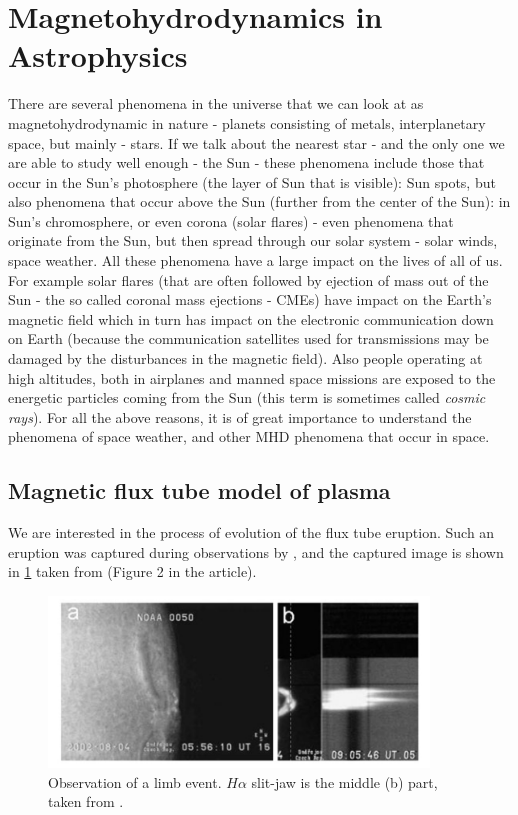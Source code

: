 \section{Magnetohydrodynamics in Astrophysics}
There are several phenomena in the universe that we can look at as magnetohydrodynamic in nature - planets consisting of metals, interplanetary space, but mainly - stars. If we talk about the nearest star - and the only one we are able to study well enough - the Sun - these phenomena include those that occur in the Sun's photosphere (the layer of Sun that is visible): Sun spots, but also phenomena that occur above the Sun (further from the center of the Sun): in Sun's chromosphere, or even corona (solar flares) - even phenomena that originate from the Sun, but then spread through our solar system - solar winds, space weather. All these phenomena have a large impact on the lives of all of us. For example solar flares (that are often followed by ejection of mass out of the Sun - the so called coronal mass ejections - CMEs) have impact on the Earth's magnetic field which in turn has impact on the electronic communication down on Earth (because the communication satellites used for transmissions may be damaged by the disturbances in the magnetic field). Also people operating at high altitudes, both in airplanes and manned space missions are exposed to the energetic particles coming from the Sun (this term is sometimes called \textit{cosmic rays}). For all the above reasons, it is of great importance to understand the phenomena of space weather, and other MHD phenomena that occur in space.

\subsection{Magnetic flux tube model of plasma}
We are interested in the process of evolution of the flux tube eruption. Such an eruption was captured during observations by \cite{miraClanek}, and the captured image is shown in \cref{figure:observation} taken from \cite{miraClanek} (Figure 2 in the article).

\begin{figure}[H]
	\begin{center}
		\includegraphics[width=0.9\textwidth]{img/td-setup/figure2fromHalpha.jpg}
	\caption{Observation of a limb event. $H\alpha$ slit-jaw is the middle (b) part, taken from \cite{miraClanek}.}
	\label{figure:observation}
	\end{center}
\end{figure}

